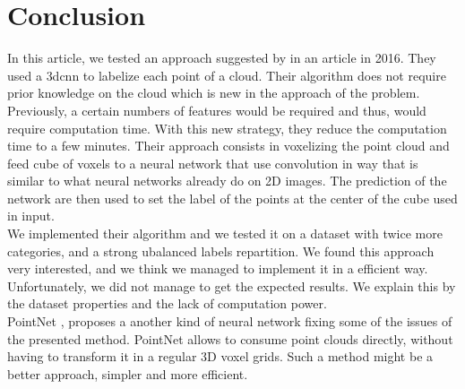 \section{Conclusion}
\label{sec:conclusion}

In this article, we tested an approach suggested by \citeauthor*{7900038} in an article \cite{7900038} in 2016. They used a \gls{3dcnn} to labelize each point of a cloud. Their algorithm does not require prior knowledge on the cloud which is new in the approach of the problem. Previously, a certain numbers of features would be required and thus, would require computation time. With this new strategy, they reduce the computation time to a few minutes. Their approach consists in voxelizing the point cloud and feed cube of voxels to a neural network that use convolution in way that is similar to what neural networks already do on 2D images. The prediction of the network are then used to set the label of the points at the center of the cube used in input.\\

We implemented their algorithm and we tested it on a dataset with twice more categories, and a strong ubalanced labels repartition. We found this approach very interested, and we think we managed to implement it in a efficient way. Unfortunately, we did not manage to get the expected results. We explain this by the dataset properties and the lack of computation power.\\

PointNet \cite{qi2016pointnet}, proposes a another kind of neural network fixing some of the issues of the presented method. PointNet allows to consume point clouds directly, without having to transform it in a regular 3D voxel grids. Such a method might be a better approach, simpler and more efficient.

